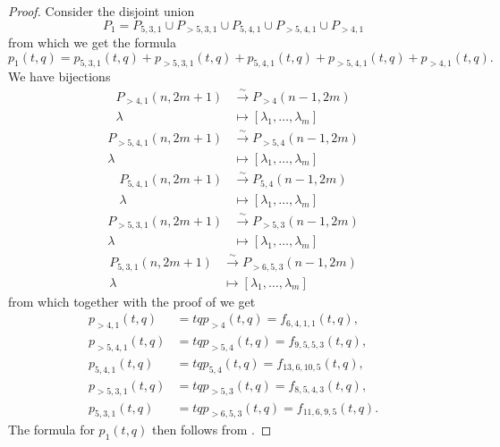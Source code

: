 \documentclass[12pt, a4paper]{article}
\theoremstyle{remark}
\begin{document}
\begin{proof}
  Consider the disjoint union
  \begin{equation*}
    P_1 = P_{5, 3, 1} \cup P_{>5, 3, 1} \cup P_{5, 4, 1} \cup P_{>5, 4, 1} \cup P_{>4, 1}
  \end{equation*}
  from which we get the formula
  \begin{equation*}
    p_1(t, q) = p_{5, 3, 1}(t, q) + p_{>5, 3, 1}(t, q) + p_{5, 4, 1}(t, q) + p_{>5, 4, 1}(t, q) + p_{>4, 1}(t, q).
  \end{equation*}
  We have bijections
  \begin{align*}
    P_{>4, 1}(n, 2m + 1) &\xrightarrow{\sim} P_{>4}(n - 1, 2m) \\
    \lambda &\mapsto [\lambda_1, \dots, \lambda_m]
  \end{align*}
  \begin{align*}
    P_{>5, 4, 1}(n, 2m + 1) &\xrightarrow{\sim} P_{>5, 4}(n - 1, 2m) \\
    \lambda & \mapsto [\lambda_1, \dots, \lambda_m]
  \end{align*}
  \begin{align*}
    P_{5, 4, 1}(n, 2m + 1) &\xrightarrow{\sim} P_{5, 4}(n - 1, 2m) \\
    \lambda &\mapsto [\lambda_1, \dots, \lambda_m]
  \end{align*}
  \begin{align*}
    P_{>5, 3, 1}(n, 2m + 1) &\xrightarrow{\sim} P_{>5, 3}(n - 1, 2m) \\
    \lambda &\mapsto [\lambda_1, \dots, \lambda_m]
  \end{align*}
  \begin{align*}
    P_{5, 3, 1}(n, 2m + 1) &\xrightarrow{\sim} P_{>6, 5, 3}(n - 1, 2m) \\
    \lambda &\mapsto [\lambda_1, \dots, \lambda_m]
  \end{align*}
  from which together with the proof of  we get
  \begin{align*}
    p_{>4, 1}(t, q) &= tqp_{>4}(t, q) = f_{6, 4, 1, 1}(t, q), \\
    p_{>5, 4, 1}(t, q) &= tqp_{>5, 4}(t, q) = f_{9, 5, 5, 3}(t, q), \\
    p_{5, 4, 1}(t, q) &= tqp_{5, 4}(t, q) = f_{13, 6, 10, 5}(t, q), \\
    p_{>5, 3, 1}(t, q) &= tqp_{>5, 3}(t, q) = f_{8, 5, 4, 3}(t, q), \\
    p_{5, 3, 1}(t, q) &= tqp_{>6, 5, 3}(t, q) = f_{11, 6, 9, 5}(t, q).
  \end{align*}
  The formula for $p_1(t, q)$ then follows from .
\end{proof}
\end{document}
